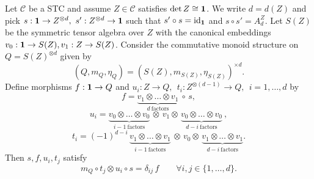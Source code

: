 \documentclass[11pt]{article}
\theoremstyle{definition}
\theoremstyle{definition}
\theoremstyle{remark}
\def\2#1{{\mathcal #1}}
\def\1#1{{\bf #1}}
\newcommand{\mcirc}{\circ}
\newcommand{\rarr}{\rightarrow}
\def\id{\mathrm{id}}
\begin{document}
\blemma \label{lem-det}
Let $\2C$ be a STC and assume $Z\in\2C$ satisfies $\det Z\cong\11$. We write $d=d(Z)$ and pick 
$s: \11\rarr Z^{\otimes d},\ s': Z^{\otimes d}\rarr\11$ such that $s'\circ s=\id_\11$ and
$s\circ s'=A_d^Z$. Let $S(Z)$ be the symmetric tensor algebra over $Z$ with the canonical 
embeddings $v_0:\11\rarr S(Z), v_1: Z\rarr S(Z)$.   
Consider the commutative monoid structure on $Q=S(Z)^{\otimes d}$ given by 
\[ (Q,m_Q,\eta_Q) = (S(Z),m_{S(Z)},\eta_{S(Z)})^{\times d}. \]
Define morphisms $f: \11\rarr Q$ and 
$u_i: Z\rarr Q,\ \ t_i: Z^{\otimes (d-1)}\rarr Q,\ \ i=1,\ldots,d$ by
\[ f= \underbrace{v_1\otimes \ldots\otimes v_1}_{d\ {\scriptstyle\mbox{factors}}}\ \circ\,s, \]
\[ u_i=\underbrace{v_0\otimes\ldots\otimes v_0}_{i-1\ {\scriptstyle \mbox{factors}}}\,\otimes\, v_1
   \otimes\,\underbrace{v_0\otimes\ldots\otimes v_0}_{d-i\ {\scriptstyle \mbox{factors}}}\ ,
\]
\[ t_i= (-1)^{d-i}\, \underbrace{v_1\otimes\ldots\otimes v_1}_{i-1\ {\scriptstyle \mbox{factors}}}  
  \,\otimes\, v_0 \otimes\,\underbrace{v_1\otimes\ldots\otimes v_1}_{d-i\ 
   {\scriptstyle \mbox{factors}}}. 
\]
Then $s,f,u_i,t_j$ satisfy
\begin{equation} \label{e-tu}
   m_Q\mcirc t_j\otimes u_i\mcirc s=\delta_{ij}\,f \quad\quad\forall i,j\in\{1,\ldots,d\}.
\end{equation}
\elemma
\end{document}
